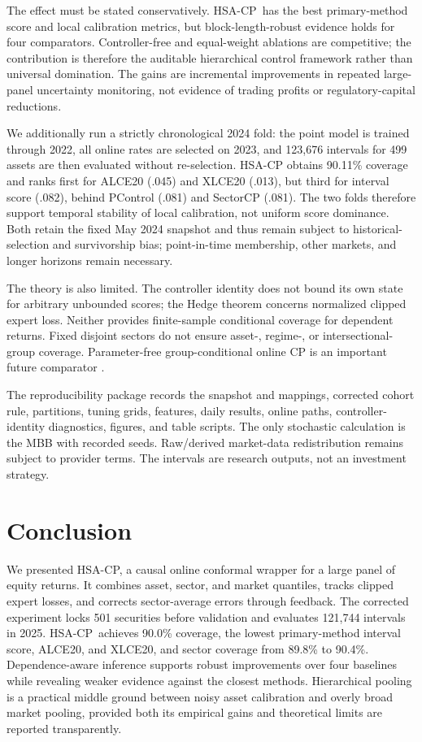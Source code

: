 \documentclass[conference]{IEEEtran}
\newcommand{\method}{HSA-CP}
\begin{document}
The effect must be stated conservatively. \method\ has the best primary-method score and local calibration metrics, but block-length-robust evidence holds for four comparators. Controller-free and equal-weight ablations are competitive; the contribution is therefore the auditable hierarchical control framework rather than universal domination. The gains are incremental improvements in repeated large-panel uncertainty monitoring, not evidence of trading profits or regulatory-capital reductions.

We additionally run a strictly chronological 2024 fold: the point model is trained through 2022, all online rates are selected on 2023, and 123,676 intervals for 499 assets are then evaluated without re-selection. HSA-CP obtains 90.11\% coverage and ranks first for ALCE20 (.045) and XLCE20 (.013), but third for interval score (.082), behind PControl (.081) and SectorCP (.081). The two folds therefore support temporal stability of local calibration, not uniform score dominance. Both retain the fixed May 2024 snapshot and thus remain subject to historical-selection and survivorship bias; point-in-time membership, other markets, and longer horizons remain necessary.

The theory is also limited. The controller identity does not bound its own state for arbitrary unbounded scores; the Hedge theorem concerns normalized clipped expert loss. Neither provides finite-sample conditional coverage for dependent returns. Fixed disjoint sectors do not ensure asset-, regime-, or intersectional-group coverage. Parameter-free group-conditional online CP is an important future comparator \cite{bharti2026group}.

The reproducibility package records the snapshot and mappings, corrected cohort rule, partitions, tuning grids, features, daily results, online paths, controller-identity diagnostics, figures, and table scripts. The only stochastic calculation is the MBB with recorded seeds. Raw/derived market-data redistribution remains subject to provider terms. The intervals are research outputs, not an investment strategy.

\section{Conclusion}

We presented \method, a causal online conformal wrapper for a large panel of equity returns. It combines asset, sector, and market quantiles, tracks clipped expert losses, and corrects sector-average errors through feedback. The corrected experiment locks 501 securities before validation and evaluates 121,744 intervals in 2025. \method\ achieves 90.0\% coverage, the lowest primary-method interval score, ALCE20, and XLCE20, and sector coverage from 89.8\% to 90.4\%. Dependence-aware inference supports robust improvements over four baselines while revealing weaker evidence against the closest methods. Hierarchical pooling is a practical middle ground between noisy asset calibration and overly broad market pooling, provided both its empirical gains and theoretical limits are reported transparently.


\end{document}
